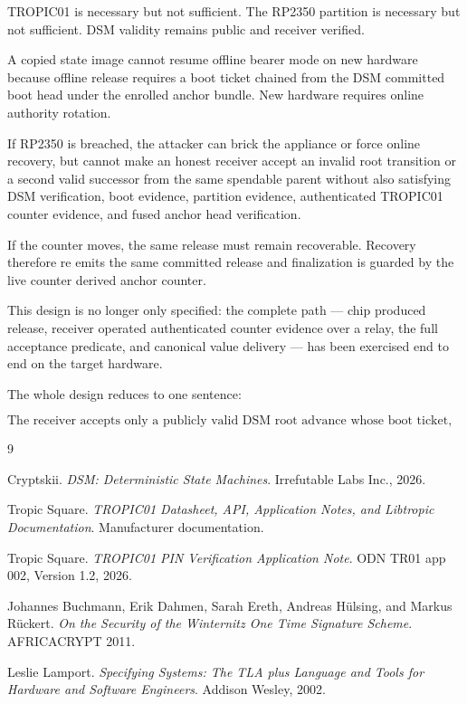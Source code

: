 \documentclass[11pt]{article}
\theoremstyle{definition}
\theoremstyle{remark}
\begin{document}
TROPIC01 is necessary but not sufficient. The RP2350 partition is necessary but not sufficient.
DSM validity remains public and receiver verified.

A copied state image cannot resume offline bearer mode on new hardware because offline release
requires a boot ticket chained from the DSM committed boot head under the enrolled anchor bundle.
New hardware requires online authority rotation.

If RP2350 is breached, the attacker can brick the appliance or force online recovery, but cannot
make an honest receiver accept an invalid root transition or a second valid successor from the same
spendable parent without also satisfying DSM verification, boot evidence, partition evidence,
authenticated TROPIC01 counter evidence, and fused anchor head verification.

If the counter moves, the same release must remain recoverable. Recovery therefore re emits the
same committed release and finalization is guarded by the live counter derived anchor counter.

This design is no longer only specified: the complete path --- chip produced release, receiver
operated authenticated counter evidence over a relay, the full acceptance predicate, and canonical
value delivery --- has been exercised end to end on the target hardware.

The whole design reduces to one sentence:

\[
\boxed{
\text{The receiver accepts only a publicly valid DSM root advance whose boot ticket, partition
certificate, TROPIC01 witness, authenticated counter evidence, and fused anchor head all verify
over the same exact successor.}
}
\]

\begin{thebibliography}{9}

Cryptskii.
\emph{DSM: Deterministic State Machines}.
Irrefutable Labs Inc., 2026.

Tropic Square.
\emph{TROPIC01 Datasheet, API, Application Notes, and Libtropic Documentation}.
Manufacturer documentation.

Tropic Square.
\emph{TROPIC01 PIN Verification Application Note}.
ODN TR01 app 002, Version 1.2, 2026.

Johannes Buchmann, Erik Dahmen, Sarah Ereth, Andreas H\"ulsing, and Markus R\"uckert.
\emph{On the Security of the Winternitz One Time Signature Scheme}.
AFRICACRYPT 2011.

Leslie Lamport.
\emph{Specifying Systems: The TLA plus Language and Tools for Hardware and Software Engineers}.
Addison Wesley, 2002.

\end{thebibliography}
\end{document}
